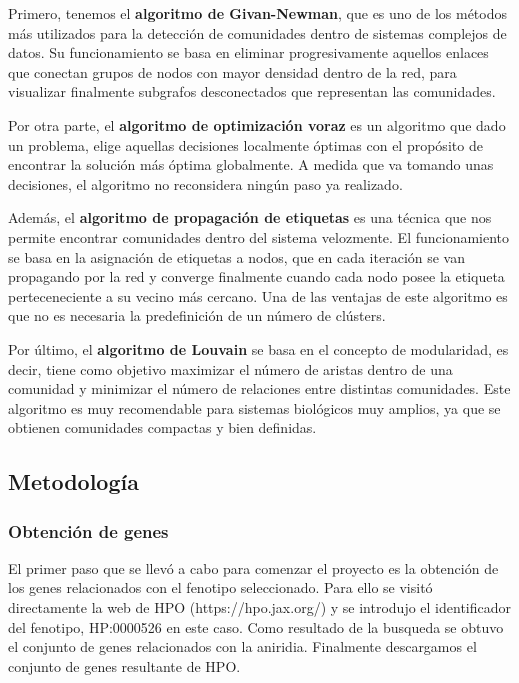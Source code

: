 Primero, tenemos el \textbf{algoritmo de Givan-Newman}, que es uno de los métodos más utilizados para la detección de comunidades dentro de sistemas complejos de datos. Su funcionamiento se basa en eliminar progresivamente aquellos enlaces que conectan grupos de nodos con mayor densidad dentro de la red, para visualizar finalmente subgrafos desconectados que representan las comunidades.

Por otra parte, el \textbf{algoritmo de optimización voraz} es un algoritmo que dado un problema, elige aquellas decisiones localmente óptimas con el propósito de encontrar la solución más óptima globalmente. A medida que va tomando unas decisiones, el algoritmo no reconsidera ningún paso ya realizado.

Además, el \textbf{algoritmo de propagación de etiquetas} es una técnica que nos permite encontrar comunidades dentro del sistema velozmente. El funcionamiento se basa en la asignación de etiquetas a nodos, que en cada iteración se van propagando por la red y converge finalmente cuando cada nodo posee la etiqueta perteceneciente a su vecino más cercano. Una de las ventajas de este algoritmo es que no es necesaria la predefinición de un número de clústers.

Por último, el \textbf{algoritmo de Louvain} se basa en el concepto de modularidad, es decir, tiene como objetivo maximizar el número de aristas dentro de una comunidad y minimizar el número de relaciones entre distintas comunidades. Este algoritmo es muy recomendable para sistemas biológicos muy amplios, ya que se obtienen comunidades compactas y bien definidas.




\subsection{\textbf{Metodología}}

\subsubsection{Obtención de genes}

El primer paso que se llevó a cabo para comenzar el proyecto es la obtención de los genes relacionados con el fenotipo seleccionado. Para ello se visitó directamente la web de HPO (https://hpo.jax.org/) y se introdujo el identificador del fenotipo, HP:0000526 en este caso. Como resultado de la busqueda se obtuvo el conjunto de genes relacionados con la aniridia. Finalmente descargamos el conjunto de genes resultante de HPO.  


